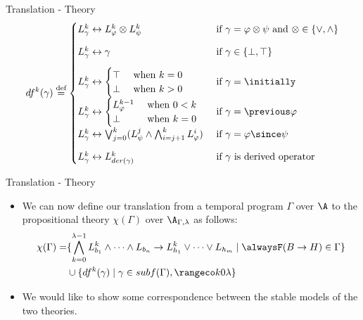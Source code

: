 \documentclass[aspectratio=169,xcolor=svgnames]{beamer}
\theoremstyle{theoremstyle_space}
\begin{document}
\begin{frame}[t]{Translation - Theory}
\begin{align*}
df^k(\gamma) \defeq \begin{cases}
  L^k_{\gamma} \leftrightarrow L_{\varphi}^k \otimes L_{\psi}^k 
  &\text{ if } \gamma = \varphi \otimes \psi \text{ and } \otimes \in \{ \vee, \wedge\}\\[2ex]
  L^k_{\gamma} \leftrightarrow \gamma
  &\text{ if } \gamma \in \{ \bot, \top \}\\[2ex]
  L^k_\gamma \leftrightarrow \begin{cases} 
    \top &\text{ when } k = 0\\
    \bot &\text{ when } k > 0
  \end{cases}
  &\text{ if } \gamma = \initially \\[2ex]
  L^k_{\gamma} \leftrightarrow \begin{cases} 
    L^{k-1}_{\varphi} &\text{ when } 0 < k\\
    \bot &\text{ when } k = 0
    \end{cases}
  &\text{ if } \gamma = \previous \varphi \\[2ex]
  L^k_{\gamma} \leftrightarrow \bigvee_{j=0}^{k}(L_\psi^j \wedge \bigwedge_{i=j+1}^{k}L_{\varphi}^i)
  &\text{ if } \gamma = \varphi \since \psi\\[2ex]
  L^k_{\gamma} \leftrightarrow L^k_{der(\gamma)}
  &\text{ if } \gamma \text{ is derived operator}
\end{cases}
\end{align*}
\end{frame}

\begin{frame}[t]{Translation - Theory}
  \begin{itemize}
  \item We can now define our translation from a temporal program
    $\Gamma$ over $\A$ to the propositional theory $\chi(\Gamma)$ over
    $\A_{\Gamma,\lambda}$ as follows:
\begin{align*}
  \chi(\Gamma)  = &\{ \bigwedge_{k=0}^{\lambda-1} L_{b_1}^k \land \dots \land L_{b_n}
                    \rightarrow L_{h_1}^k \lor \dots \lor L_{h_m} \mid \tempruleshort \in \Gamma \} \\
                  & \cup \{ df^k(\gamma) \mid \gamma \in subf(\Gamma), \kinlambda \}
\end{align*}
\item We would like to show some correspondence between the stable
  models of the two theories.
  \end{itemize}
\end{frame}
\end{document}
